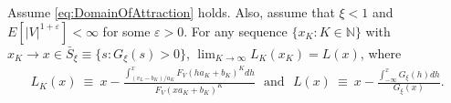  \begin{lemma}\label{lem:integralConv}
 Assume \eqref{eq:DomainOfAttraction} holds. Also, assume that $\xi<1$ and $E[|V|^{1+\varepsilon}]<\infty$ for some $\varepsilon>0$. For any sequence $\{ x_{K}:K\in \mathbb{N} \} $ with $x_{K}\to x\in \bar{S}_{\xi} \equiv \{ s:G_{\xi }(s) >0\} $, $\lim_{K \to \infty} L_{K}( x_{K}) = L( x)$, where
 \begin{align}
 L_{K}( x) ~\equiv~ x - \tfrac{\int_{{(v_L-b_K)/a_K} }^{x}{F_{V}(ha_{K}+b_{K})^{K}}dh}{F_{V}( xa_{K}+b_{K}) ^{K}}~~~\text{and}~~~L( x) ~\equiv~ x -\tfrac{\int_{-\infty }^{x}G_{\xi }(h) dh}{G_{\xi }( x) }.\label{eq:LKdefn}
\end{align}
\end{lemma}
